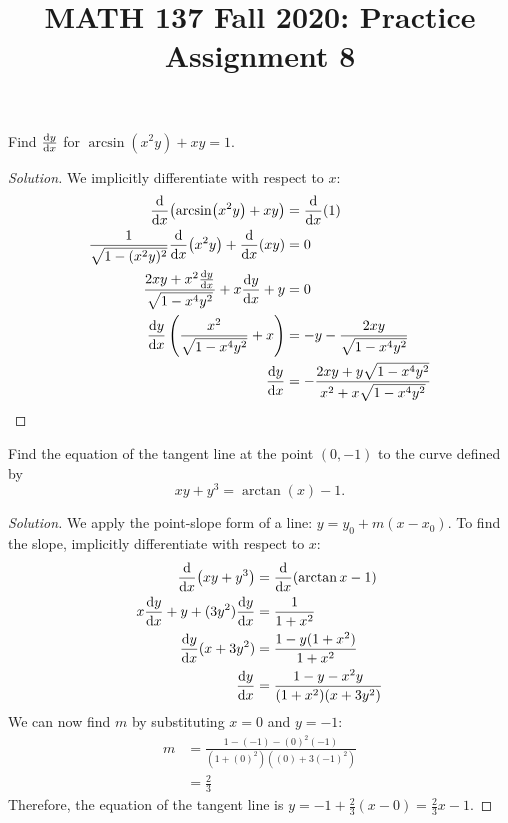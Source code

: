 
\title{MATH 137 Fall 2020: Practice Assignment 8}


\thispagestyle{firstpage}

\textbf{\@title}

\question Find $\dv{y}{x}$ for $\arcsin(x^2y)+xy=1$.
\begin{proof}[Solution]
  We implicitly differentiate with respect to $x$:
  \begin{align*}
    \dv{x}(\arcsin(x^2y) + xy)                            & = \dv{x}(1)                                                   \\
    \frac{1}{\sqrt{1-(x^2 y)^2}}\dv{x}(x^2y) + \dv{x}(xy) & = 0                                                           \\
    \frac{2xy + x^2\dv{y}{x}}{\sqrt{1-x^4y^2}} + x\dv{y}{x} + y     & = 0                                                           \\
    \dv{y}{x}{}\left(\frac{x^2}{\sqrt{1-x^4y^2}}+x\right)      & = - y - \frac{2xy}{\sqrt{1-x^4y^2}}                           \\
    \dv{y}{x}                                                  & = -\frac{2xy+y\sqrt{1-x^4y^2}}{x^2+x\sqrt{1-x^4y^2}} \qedhere
  \end{align*}
\end{proof}


\question Find the equation of the tangent line at the point $(0, -1)$ to the curve defined by
\[ xy+y^3 = \arctan(x)-1. \]
\begin{proof}[Solution]
  We apply the point-slope form of a line: $y = y_0+m(x-x_0)$.
  To find the slope, implicitly differentiate with respect to $x$:
  \begin{align*}
    \dv{x}(xy+y^3)         & = \dv{x}(\arctan x - 1)            \\
    x\dv{y}{x} + y + (3y^2)\dv{y}{x} & = \frac{1}{1+x^2}                  \\
    \dv{y}{x}{}(x+3y^2)         & = \frac{1-y(1+x^2)}{1+x^2}         \\
    \dv{y}{x}                   & = \frac{1-y-x^2y}{(1+x^2)(x+3y^2)}
  \end{align*}
  We can now find $m$ by substituting $x=0$ and $y=-1$:
  \begin{align*}
    m & = \frac{1-(-1)-(0)^2(-1)}{(1+(0)^2)((0)+3(-1)^2)} \\
      & = \frac23
  \end{align*}
  Therefore, the equation of the tangent line is $y = -1 + \frac23(x-0) = \frac23x - 1$.
\end{proof}


